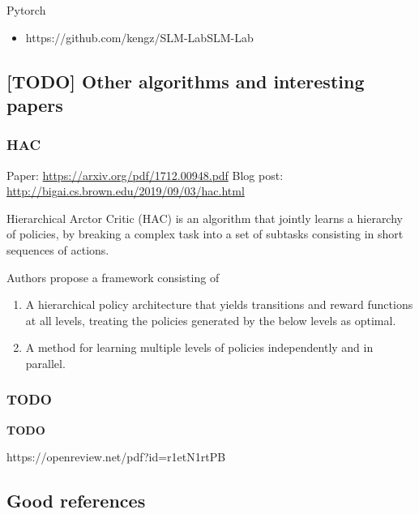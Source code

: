 \documentclass[12pt, english]{article}
\begin{document}
Pytorch

\begin{itemize}
  \item {https://github.com/kengz/SLM-Lab}{SLM-Lab}
\end{itemize}


\subsection{[TODO] Other algorithms and interesting papers}

\subsubsection{HAC}

Paper: \url{https://arxiv.org/pdf/1712.00948.pdf}
Blog post: \url{http://bigai.cs.brown.edu/2019/09/03/hac.html}

Hierarchical Arctor Critic (HAC) \cite{levy_learning_2019} is an algorithm that jointly learns a hierarchy of policies, by breaking a complex task into a set of subtasks consisting in short sequences of actions.

Authors propose a framework consisting of

\begin{enumerate}
  \item A hierarchical policy architecture that yields transitions and reward functions at all levels, treating the policies generated by the below levels as optimal.
  \item A method for learning multiple levels of policies independently and in parallel.
\end{enumerate}


\subsubsection{TODO}


\textbf{TODO}

https://openreview.net/pdf?id=r1etN1rtPB


\subsection{Good references}
\end{document}
